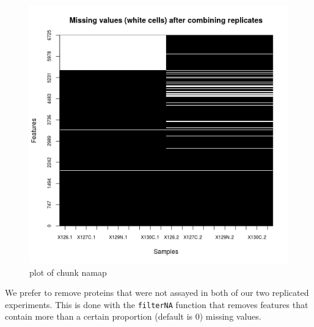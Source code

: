 \begin{Shaded}
\begin{Highlighting}[]
\NormalTok{(} \NormalTok{(}\NormalTok{, }\NormalTok{),}
        \NormalTok{)}
\end{Highlighting}
\end{Shaded}

\begin{figure}[htbp]
\centering
\includegraphics{figure/namap-1.png}
\caption{plot of chunk namap}
\end{figure}

We prefer to remove proteins that were not assayed in both of our two
replicated experiments. This is done with the \texttt{filterNA} function
that removes features that contain more than a certain proportion
(default is 0) missing values.

\begin{Shaded}
\begin{Highlighting}[]
\StringTok{ }
\end{Highlighting}
\end{Shaded}

